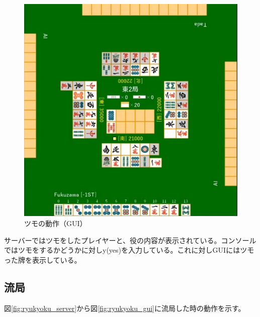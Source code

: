 \documentclass[a4j,titlepage]{jsarticle}
\begin{document}
\begin{figure}[H]
  \centering
  \includegraphics[scale = 0.8]{images/tsumo_gui.png}
  \caption{ツモの動作（GUI）}
  \label{fig:tsumo_gui}
\end{figure}

サーバーではツモをしたプレイヤーと、役の内容が表示されている。コンソールではツモをするかどうかに対しy(yes)を入力している。これに対しGUIにはツモった牌を表示している。

\subsection{流局}
図\ref{fig:ryukyoku_server}から図\ref{fig:ryukyoku_gui}に流局した時の動作を示す。
\end{document}
